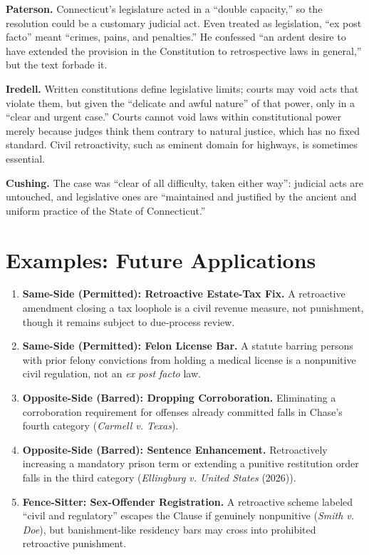 \documentclass[12pt]{article}
\begin{document}
\textbf{Paterson.} Connecticut's legislature acted in a ``double capacity,'' so the resolution could be a customary judicial act. Even treated as legislation, ``ex post facto'' meant ``crimes, pains, and penalties.'' He confessed ``an ardent desire to have extended the provision in the Constitution to retrospective laws in general,'' but the text forbade it.

\textbf{Iredell.} Written constitutions define legislative limits; courts may void acts that violate them, but given the ``delicate and awful nature'' of that power, only in a ``clear and urgent case.'' Courts cannot void laws within constitutional power merely because judges think them contrary to natural justice, which has no fixed standard. Civil retroactivity, such as eminent domain for highways, is sometimes essential.

\textbf{Cushing.} The case was ``clear of all difficulty, taken either way'': judicial acts are untouched, and legislative ones are ``maintained and justified by the ancient and uniform practice of the State of Connecticut.''

\section{Examples: Future Applications}

\begin{enumerate}
\item \textbf{Same-Side (Permitted): Retroactive Estate-Tax Fix.} A retroactive amendment closing a tax loophole is a civil revenue measure, not punishment, though it remains subject to due-process review.
\item \textbf{Same-Side (Permitted): Felon License Bar.} A statute barring persons with prior felony convictions from holding a medical license is a nonpunitive civil regulation, not an \textit{ex post facto} law.
\item \textbf{Opposite-Side (Barred): Dropping Corroboration.} Eliminating a corroboration requirement for offenses already committed falls in Chase's fourth category (\textit{Carmell v. Texas}).
\item \textbf{Opposite-Side (Barred): Sentence Enhancement.} Retroactively increasing a mandatory prison term or extending a punitive restitution order falls in the third category (\textit{Ellingburg v. United States} (2026)).
\item \textbf{Fence-Sitter: Sex-Offender Registration.} A retroactive scheme labeled ``civil and regulatory'' escapes the Clause if genuinely nonpunitive (\textit{Smith v. Doe}), but banishment-like residency bars may cross into prohibited retroactive punishment.
\end{enumerate}
\end{document}

